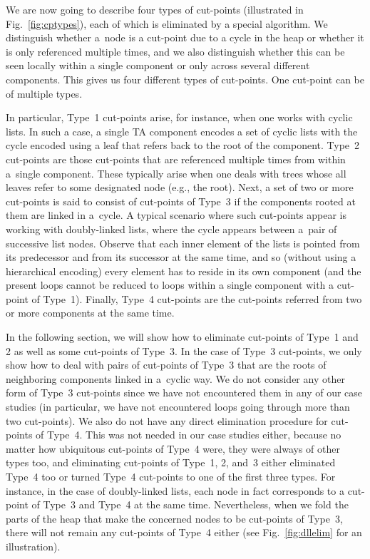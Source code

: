 We are now going to describe four types of cut-points (illustrated in
Fig.~\ref{fig:cptypes}), each of which is eliminated by a special algorithm. 
We distinguish whether a~node is a cut-point due to a cycle in the heap or whether it is only referenced multiple times, 
and we also distinguish whether this can be seen locally within a single component or only across several different components.
This gives us four different types of cut-points.
One cut-point can be of multiple types.

In particular, Type~1 cut-points arise, for instance, when one works with cyclic
lists. In such a case, a single TA component encodes a set of cyclic lists with the
cycle encoded using a leaf that refers back to the root of the component. Type~2
cut-points are those cut-points that are referenced multiple times from within
a~single component. These typically arise when one deals with trees whose all leaves
refer to some designated node (e.g., the root). Next, a set of two or more cut-points
is said to consist of cut-points of Type~3 if the components rooted at them are linked
in a~cycle. A typical scenario where such cut-points appear is working with
doubly-linked lists, where the cycle appears between a~pair of successive list nodes.
Observe that each inner element of the lists is pointed from its predecessor and
from its successor at the same time, and so (without using a hierarchical encoding)
every element has to reside in its own component (and the present loops cannot be
reduced to loops within a single component with a cut-point of Type~1). Finally,
Type~4 cut-points are the cut-points referred from two or more components at the
same time.

In the following section, we will show how to eliminate cut-points of Type~1 and 2
as well as some cut-points of Type~3. In the case of Type~3 cut-points, 
we only show how to deal with pairs of cut-points of Type~3 that are the roots of neighboring components linked
in a~cyclic way.
We do not consider any other form of Type~3 cut-points since we have not
encountered them in any of our case studies (in particular, we have not
encountered loops going through more than two cut-points).
We also do not have any direct elimination procedure for cut-points of Type~4.
This was not needed in our case studies either, because no matter how
ubiquitous cut-points of Type~4 were, they were always of other types too, and
eliminating cut-points of Type~1, 2, and~3 either eliminated Type~4 too or
turned Type~4 cut-points to one of the first three types.
For instance, in the case of doubly-linked lists, each node in fact
corresponds to a cut-point of Type~3 and Type~4 at the same time. Nevertheless, when
we fold the parts of the heap that make the concerned nodes to be cut-points of
Type~3, there will not remain any cut-points of Type~4 either (see
Fig.~\ref{fig:dllelim} for an illustration). 

